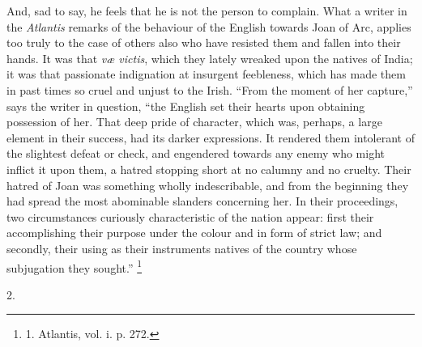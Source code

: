 And, sad to say, he feels that
he is not the person to complain. What a writer in the \emph{Atlantis}
remarks of the behaviour of the English towards Joan of Arc, applies
too truly to the case of others also who have resisted them and fallen
into their hands. It was that \emph{væ victis}, which they lately
wreaked upon the natives of India; it was that passionate indignation
at insurgent feebleness, which has made them in past times so cruel
and unjust to the Irish. ``From the moment of her capture,'' says the
writer in question, ``the English set their hearts upon obtaining
possession of her. That deep pride of character, which was, perhaps, a
large element in their success, had its darker expressions. It
rendered them intolerant of the slightest defeat or check, and
engendered towards any enemy who might inflict it upon them, a hatred
stopping short at no calumny and no cruelty. Their hatred of Joan was
something wholly indescribable, and from the beginning they had spread
the most abominable slanders concerning her. In their proceedings, two
circumstances curiously characteristic of the nation appear: first
their accomplishing their purpose under the colour and in form of
strict law; and secondly, their using as their instruments natives of
the country whose subjugation they sought.'' \footnote{1. Atlantis, vol. i. p. 272.}

2.

